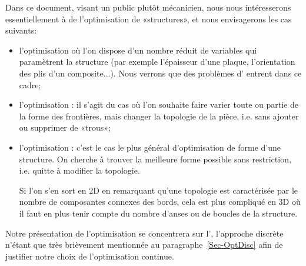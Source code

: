 \medskip
Dans ce document, visant un public plutôt mécanicien, nous nous intéresserons essentiellement à de l'optimisation de «structures», et nous envisagerons les cas suivants:
\begin{itemize}
   \item l'optimisation  où l'on dispose d'un nombre réduit de variables qui paramètrent la structure (par exemple l'épaisseur d'une plaque, l'orientation des plis d'un composite...). Nous verrons que des problèmes d' entrent dans ce cadre;
   \item l'optimisation : il s'agit du cas où l'on souhaite faire varier toute ou partie de la forme des frontières, mais  changer la topologie de la pièce, i.e. sans ajouter ou supprimer de «trous»;
   \item l'optimisation : c'est le cas le plus général d'optimisation de forme d'une structure. On cherche à trouver la meilleure forme possible sans restriction, i.e. quitte à modifier la topologie.

   Si l'on s'en sort en 2D en remarquant qu'une topologie est caractérisée par le nombre de composantes connexes des bords, cela est plus compliqué en 3D où il faut en plus tenir compte du nombre d'anses ou de boucles de la structure.
\end{itemize}

Notre présentation de l'optimisation se concentrera sur l', l'approche discrète n'étant que très brièvement mentionnée au paragraphe~\ref{Sec-OptDisc} afin de justifier notre choix de l'optimisation continue.

